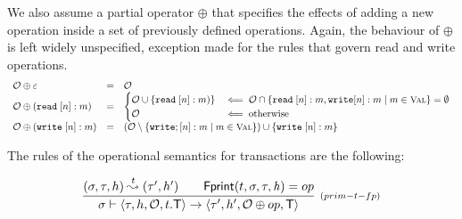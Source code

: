 \documentclass[a4paper,UKenglish]{article}%
\theoremstyle{plain}
\begin{document}
We also assume a partial operator $\oplus$ that specifies the effects of adding a new operation inside 
a set of previously defined operations. Again, the behaviour of $\oplus$ is left widely unspecified, 
exception made for the rules that govern read and write operations.
\[
\begin{array}{lcl}
\mathcal{O} \oplus \varepsilon &=& \mathcal{O}\\
\mathcal{O} \oplus (\RD\;[n]: m) &=&
\begin{cases}
\mathcal{O} \cup \{\RD\; [n]: m)\} & \impliedby \mathcal{O} \cap \{ \RD\;[n]: m, \WR [n]: m \mid m \in \Val\} = \emptyset\\
\mathcal{O} & \impliedby \text{otherwise}
\end{cases}\\
\mathcal{O} \oplus (\WR\;[n]: m) &=& 
(\mathcal{O} \setminus \{ \WR;[n] : m \mid m \in \Val \}) \cup \{\WR\;[n]: m \}
\end{array}
\]

The rules of the operational semantics for transactions are the following: 

\[
\infer[{\scriptstyle{(prim-t-fp)}}]
{\thdstack \vdash \langle \txstack, \heap, \mathcal{O}, t.\trans  \rangle \rightarrow \langle \txstack', \heap', \mathcal{O} \oplus op, \trans \rangle}
{(\thdstack, \txstack, \heap) \toT{t} (\txstack', \heap') \qquad \fingerprint(t,\thdstack,\txstack,\h) = op}
\]

\end{document}
